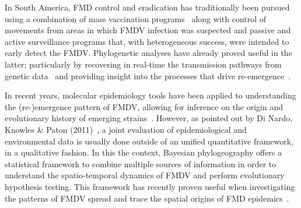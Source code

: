 \documentclass[10pt]{article}
\begin{document}
In South America, FMD control and eradication has traditionally been pursued using a combination of mass vaccination programs~\cite{vaccinationSA} along with control of movements from areas in which FMDV infection was suspected and passive and active surveillance programs that, with heterogeneous success, were intended to early detect the FMDV.
Phylogenetic analyses have already proved useful in the latter; particularly by recovering in real-time the transmission pathways from genetic data~\cite{cottam2007,cottam2008} and providing insight into the processes that drive re-emergence~\cite{combining}.

In recent years, molecular epidemiology tools have been applied to understanding the (re-)emergence pattern of FMDV, allowing for inference on the origin and evolutionary history of emerging strains~\cite{Perez2001,Malirat2007,andean,Malirat2011,Maradei2013}.
However, as pointed out by Di Nardo, Knowles \&  Paton (2011)~\cite{combining}, a joint evaluation of epidemiological and environmental data is usually done outside of an unified quantitative framework, in a qualitative fashion.
In this the context, Bayesian phylogeography offers a statistical framework to combine multiple sources of information in order to understand the spatio-temporal dynamics of FMDV and perform evolutionary hypothesis testing.
This framework has recently proven useful when investigating the patterns of FMDV spread and trace the spatial origins of FMD epidemics~\cite{Carvalho2013,bulgaria,phymal,hall2013}.

\end{document}
